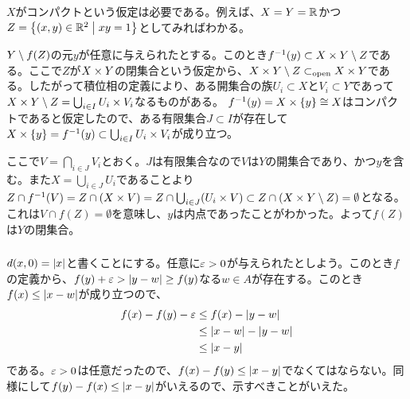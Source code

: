 \subsubsection{} %
\begin{rem}
  $X$がコンパクトという仮定は必要である。例えば、$X=Y={\mathbb R}$かつ$Z=\left\{ (x,y) \in {\mathbb R}^2 \mathrel{} \middle| \mathrel{} xy=1 \right\}$としてみればわかる。
\end{rem}
\begin{sol}
$Y \setminus f(Z)$の元$y$が任意に与えられたとする。このとき$f^{-1}(y) \subset X \times Y \setminus Z$である。ここで$Z$が$X\times Y$の閉集合という仮定から、$X \times Y \setminus Z \subset_{\text{open}} X \times Y$である。したがって積位相の定義により、ある開集合の族$U_i \subset X$と$V_i \subset Y$であって$X \times Y \setminus Z = \bigcup_{i \in I} U_i \times V_i$なるものがある。
$f^{-1}(y) = X \times \{ y \} \cong X$はコンパクトであると仮定したので、ある有限集合$J \subset I$が存在して$X \times \{y\} = f^{-1}(y) \subset \bigcup_{i \in I} U_i \times V_i$が成り立つ。

ここで$V = \bigcap_{i \in J} V_i$とおく。$J$は有限集合なので$V$は$Y$の開集合であり、かつ$y$を含む。また$X = \bigcup_{i \in J} U_i$であることより$Z \cap f^{-1}(V) = Z \cap (X \times V) = Z \cap \bigcup_{i \in J} (U_i \times V) \subset Z \cap (X \times Y \setminus Z) = \emptyset$となる。
これは$V \cap f(Z) = \emptyset$を意味し、$y$は内点であったことがわかった。よって$f(Z)$は$Y$の閉集合。
\end{sol}


\newpage

\subsubsection{} %
\begin{sol}
  $d(x,0) = \left \lvert x \right \rvert$と書くことにする。任意に${\varepsilon} > 0$が与えられたとしよう。このとき$f$の定義から、$f(y) + {\varepsilon} > \left \lvert y-w \right \rvert \geq f(y)$なる$w \in A$が存在する。このとき$f(x) \leq \left \lvert x-w \right \rvert$が成り立つので、
  \begin{align*}
    f(x) - f(y) - {\varepsilon} &\leq f(x) - \left \lvert y-w \right \rvert \\
    &\leq \left \lvert x-w \right \rvert - \left \lvert y-w \right \rvert \\
    &\leq \left \lvert x-y \right \rvert
  \end{align*}
  である。${\varepsilon} > 0$は任意だったので、$f(x) - f(y) \leq \left \lvert x-y \right \rvert$でなくてはならない。同様にして$f(y) - f(x) \leq \left \lvert x-y \right \rvert$がいえるので、示すべきことがいえた。
\end{sol}
